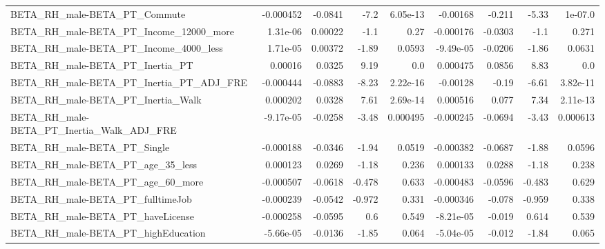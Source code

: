 \begin{tabular}{lrrrrrrrr}
BETA\_RH\_male-BETA\_PT\_Commute                       &   -0.000452 &      -0.0841 &     -7.2 & 6.05e-13 &   -0.00168 &      -0.211 &        -5.33 &       1e-07.0 \\
BETA\_RH\_male-BETA\_PT\_Income\_12000\_more             &    1.31e-06 &      0.00022 &     -1.1 &     0.27 &  -0.000176 &     -0.0303 &         -1.1 &         0.271 \\
BETA\_RH\_male-BETA\_PT\_Income\_4000\_less              &    1.71e-05 &      0.00372 &    -1.89 &   0.0593 &  -9.49e-05 &     -0.0206 &        -1.86 &        0.0631 \\
BETA\_RH\_male-BETA\_PT\_Inertia\_PT                    &     0.00016 &       0.0325 &     9.19 &      0.0 &   0.000475 &      0.0856 &         8.83 &           0.0 \\
BETA\_RH\_male-BETA\_PT\_Inertia\_PT\_ADJ\_FRE            &   -0.000444 &      -0.0883 &    -8.23 & 2.22e-16 &   -0.00128 &       -0.19 &        -6.61 &      3.82e-11 \\
BETA\_RH\_male-BETA\_PT\_Inertia\_Walk                  &    0.000202 &       0.0328 &     7.61 & 2.69e-14 &   0.000516 &       0.077 &         7.34 &      2.11e-13 \\
BETA\_RH\_male-BETA\_PT\_Inertia\_Walk\_ADJ\_FRE          &   -9.17e-05 &      -0.0258 &    -3.48 & 0.000495 &  -0.000245 &     -0.0694 &        -3.43 &      0.000613 \\
BETA\_RH\_male-BETA\_PT\_Single                        &   -0.000188 &      -0.0346 &    -1.94 &   0.0519 &  -0.000382 &     -0.0687 &        -1.88 &        0.0596 \\
BETA\_RH\_male-BETA\_PT\_age\_35\_less                   &    0.000123 &       0.0269 &    -1.18 &    0.236 &   0.000133 &      0.0288 &        -1.18 &         0.238 \\
BETA\_RH\_male-BETA\_PT\_age\_60\_more                   &   -0.000507 &      -0.0618 &   -0.478 &    0.633 &  -0.000483 &     -0.0596 &       -0.483 &         0.629 \\
BETA\_RH\_male-BETA\_PT\_fulltimeJob                   &   -0.000239 &      -0.0542 &   -0.972 &    0.331 &  -0.000346 &      -0.078 &       -0.959 &         0.338 \\
BETA\_RH\_male-BETA\_PT\_haveLicense                   &   -0.000258 &      -0.0595 &      0.6 &    0.549 &  -8.21e-05 &      -0.019 &        0.614 &         0.539 \\
BETA\_RH\_male-BETA\_PT\_highEducation                 &   -5.66e-05 &      -0.0136 &    -1.85 &    0.064 &  -5.04e-05 &      -0.012 &        -1.84 &         0.065 \\

\end{tabular}
